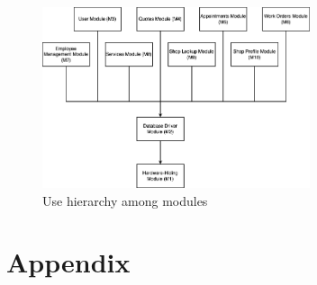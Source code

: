 \documentclass[12pt, titlepage]{article}
\begin{document}
\begin{figure}[H]
	\centering
	\includegraphics[width=0.7\textwidth]{UsesHierarchy.png}
	\caption{Use hierarchy among modules}
	\label{FigUH}
\end{figure}

\newpage




\newpage

\section{Appendix}

\end{document}
